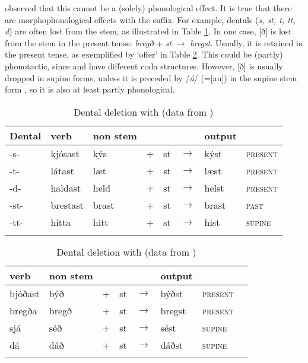 \documentclass[output=paper]{langscibook}
\begin{document}
\citet{Anderson:1990sm} observed that this cannot be a (solely) phonological effect. It is true that there are morphophonological effects with the \sti{} suffix. For example, dentals (\textit{s, st, t, tt, d}) are often lost from the stem, as illustrated in Table \ref{woodstem}. In one case, [ð] is lost from the stem in the present tense: \textit{bregð} + \textit{st} $\rightarrow$ \textit{bregst}. Usually, it is retained in the present tense, as exemplified by  `offer' in Table \ref{woodeth}. This could be (partly) phonotactic, since  and  have different coda structures.  However, [ð] is usually dropped in supine forms, unless it is preceded by /\textit{á}/ (=[au]) in the supine stem form \citep[380]{Thomson:1987bn}, so it is also at least partly phonological.


\begin{table}[h!]
\caption{Dental deletion with \sti{} (data from \citealt[380]{Thomson:1987bn})
\label{woodstem}}  
\begin{tabular}{llllllll}
\lsptoprule
Dental & \sti{} verb & non\sti{} stem & & & & output & \\\midrule
-s- & kjósast & kýs & + & st & $\rightarrow$ & kýst & \textsc{present}\\
-t- & látast & læt & + & st & $\rightarrow$ & læst & \textsc{present}\\
-d- & haldast & held & + & st & $\rightarrow$ & helst & \textsc{present}\\
-st- & brestast & brast & + & st & $\rightarrow$ & brast & \textsc{past}\\
-tt- & hitta & hitt & + & st & $\rightarrow$ & hist & \textsc{supine} \\
\lspbottomrule
\end{tabular}
\end{table}

\begin{table}
\caption{Dental deletion with \sti{} (data from \citealt[380]{Thomson:1987bn})\label{woodeth}} 
\begin{tabular}{llllllll}
\lsptoprule
\sti{} verb & non\sti{} stem & & & & output & \\\midrule
bjóðast & býð & + & st & $\rightarrow$ & býðst & \textsc{present} \\
bregða & bregð & + & st & $\rightarrow$ & bregst & \textsc{present} \\
sjá & séð & + & st & $\rightarrow$ & sést & \textsc{supine} \\
dá & dáð & + & st & $\rightarrow$ & dáðst & \textsc{supine} \\
\lspbottomrule
\end{tabular}
\end{table}
\end{document}
